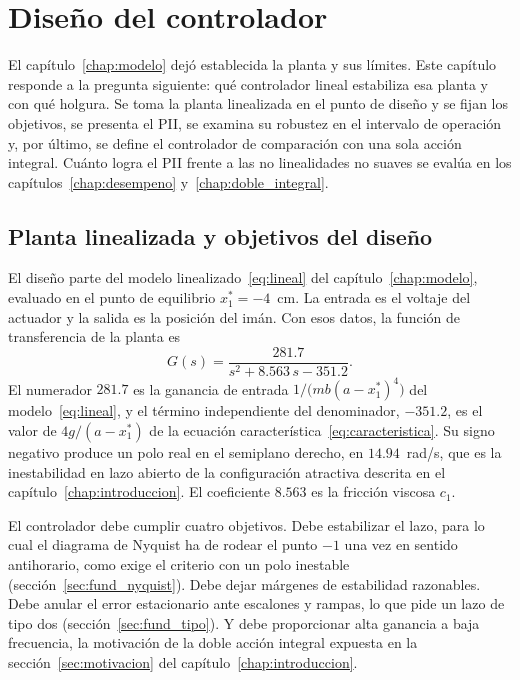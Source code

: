 \chapter{Diseño del controlador}\label{chap:controlador}

El capítulo~\ref{chap:modelo} dejó establecida la planta y sus límites. Este capítulo responde a la pregunta siguiente: qué controlador lineal estabiliza esa planta y con qué holgura. Se toma la planta linealizada en el punto de diseño y se fijan los objetivos, se presenta el PII, se examina su robustez en el intervalo de operación y, por último, se define el controlador de comparación con una sola acción integral. Cuánto logra el PII frente a las no linealidades no suaves se evalúa en los capítulos~\ref{chap:desempeno} y~\ref{chap:doble_integral}.

\section{Planta linealizada y objetivos del diseño}\label{sec:planta_diseno}

El diseño parte del modelo linealizado~\eqref{eq:lineal} del capítulo~\ref{chap:modelo}, evaluado en el punto de equilibrio $x_1^*=-4$~cm. La entrada es el voltaje del actuador y la salida es la posición del imán. Con esos datos, la función de transferencia de la planta es
\begin{equation}
G(s)=\frac{281.7}{s^{2}+8.563\,s-351.2} .
\label{eq:planta}
\end{equation}
El numerador $281.7$ es la ganancia de entrada $1/\bigl(mb(a-x_1^*)^4\bigr)$ del modelo~\eqref{eq:lineal}, y el término independiente del denominador, $-351.2$, es el valor de $4g/(a-x_1^*)$ de la ecuación característica~\eqref{eq:caracteristica}. Su signo negativo produce un polo real en el semiplano derecho, en $14.94$~rad/s, que es la inestabilidad en lazo abierto de la configuración atractiva descrita en el capítulo~\ref{chap:introduccion}. El coeficiente $8.563$ es la fricción viscosa $c_1$.

El controlador debe cumplir cuatro objetivos. Debe estabilizar el lazo, para lo cual el diagrama de Nyquist ha de rodear el punto $-1$ una vez en sentido antihorario, como exige el criterio con un polo inestable (sección~\ref{sec:fund_nyquist}). Debe dejar márgenes de estabilidad razonables. Debe anular el error estacionario ante escalones y rampas, lo que pide un lazo de tipo dos (sección~\ref{sec:fund_tipo}). Y debe proporcionar alta ganancia a baja frecuencia, la motivación de la doble acción integral expuesta en la sección~\ref{sec:motivacion} del capítulo~\ref{chap:introduccion}.

